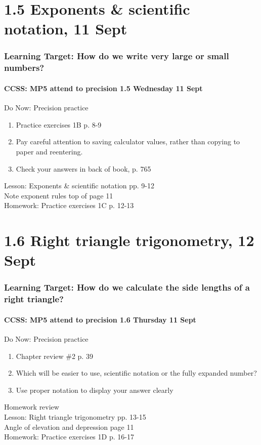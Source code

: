 \documentclass{beamer}
\begin{document}
  \section{1.5 Exponents \& scientific notation, 11 Sept}
  \frame
  {
    \frametitle{Learning Target: How do we write very large or small numbers?}
    \framesubtitle{CCSS: MP5 attend to precision \hfill \alert{1.5 Wednesday 11 Sept}}

    \begin{block}{Do Now: Precision practice}
    \begin{enumerate}
        \item Practice exercises 1B p. 8-9
        \item Pay careful attention to saving calculator values, rather than copying to paper and reentering.
        \item Check your answers in back of book, p. 765
    \end{enumerate}
    \end{block}
    Lesson: Exponents \& scientific notation pp. 9-12\\ \smallskip
    Note exponent rules top of page 11\\ \smallskip
    Homework: Practice exercises 1C p. 12-13
  }


  \section{1.6 Right triangle trigonometry, 12 Sept}
  \frame
  {
    \frametitle{Learning Target: How do we calculate the side lengths of a right triangle?}
    \framesubtitle{CCSS: MP5 attend to precision \hfill \alert{1.6 Thursday 11 Sept}}

    \begin{block}{Do Now: Precision practice}
    \begin{enumerate}
        \item Chapter review \#2 p. 39
        \item Which will be easier to use, scientific notation or the fully expanded number?
        \item Use proper notation to display your answer clearly
    \end{enumerate}
    \end{block}
    Homework review \\
    Lesson: Right triangle trigonometry pp. 13-15\\ \smallskip
    Angle of elevation and depression page 11\\ \smallskip
    Homework: Practice exercises 1D p. 16-17
  }
\end{document}

